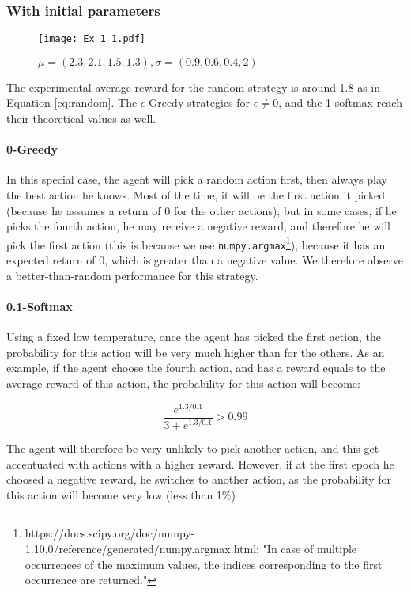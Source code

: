 \documentclass[a4paper,11pt]{article}
\begin{document}
\subsubsection{With initial parameters}
\begin{figure}[H]
  \center
  \texttt{[image: Ex\_1\_1.pdf]}
  \caption{\label{fig:1.1} $\mu = (2.3, 2.1, 1.5, 1.3), \sigma = (0.9, 0.6, 0.4, 2)$}
\end{figure}

The experimental average reward for the random strategy is around 1.8 as in Equation \ref{eq:random}. The $\epsilon$-Greedy strategies for $\epsilon \neq 0$, and the 1-softmax reach their theoretical values as well.

\paragraph{0-Greedy}
In this special case, the agent will pick a random action first, then always play the best action he knows. Most of the time, it will be the first action it picked (because he assumes a return of 0 for the other actions); but in some cases, if he picks the fourth action, he may receive a negative reward, and therefore he will pick the first action (this is because we use \texttt{numpy.argmax}\footnote{https://docs.scipy.org/doc/numpy-1.10.0/reference/generated/numpy.argmax.html: "In case of multiple occurrences of the maximum values, the indices corresponding to the first occurrence are returned."}), because it has an expected return of 0, which is greater than a negative value. We therefore observe a better-than-random performance for this strategy.

\paragraph{0.1-Softmax}
Using a fixed low temperature, once the agent has picked the first action, the probability for this action will be very much higher than for the others. As an example, if the agent choose the fourth action, and has a reward equals to the average reward of this action, the probability for this action will become:

$$ \frac{e^{1.3/0.1}}{3 + e^{1.3/0.1}} > 0.99 $$

The agent will therefore be very unlikely to pick another action, and this get accentuated with actions with a higher reward. However, if at the first epoch he choosed a negative reward, he switches to another action, as the probability for this action will become very low (less than 1\%)
\end{document}
